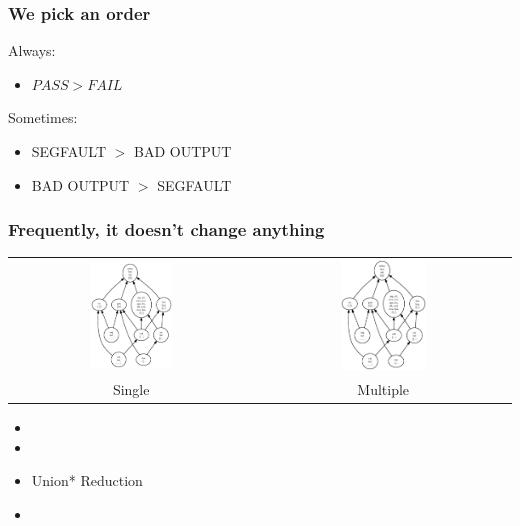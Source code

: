 \documentclass[svgnames,14pt]{beamer}
\newcommand\fail{\mathit{FAIL}}
\newcommand\pass{\mathit{PASS}}
\theoremstyle{definition}
\begin{document}
\begin{frame}
\frametitle{We pick an order}
Always:
\begin{itemize}
\item $\pass>\fail$
\end{itemize}
Sometimes:
\begin{itemize}
\item SEGFAULT $>$ BAD OUTPUT
\item BAD OUTPUT $>$ SEGFAULT
\end{itemize}
\end{frame}

\begin{frame}
\frametitle{Frequently, it doesn't change anything}

\begin{center} 
\begin{tabular}{cc}
\includegraphics[width=0.35\textwidth]{rank1b.ps}
&
\includegraphics[width=0.35\textwidth]{rank2b.ps}\\
Single &
Multiple \\
\end{tabular}
\end{center}

\end{frame}


\begin{frame}
\begin{itemize}
\frametitle{Overview}
\item {}
\item {}
\item Union* Reduction
\item {}
\end{itemize}
\end{frame}
\end{document}
